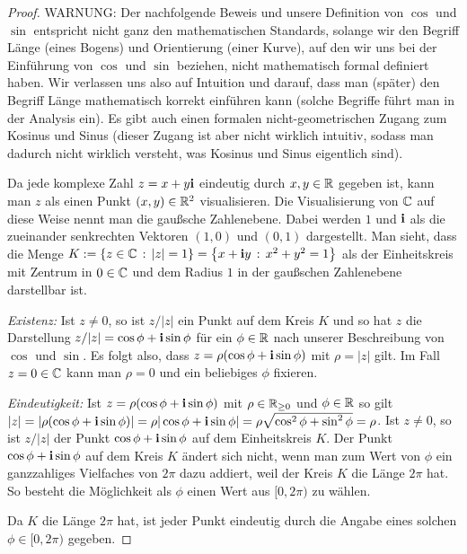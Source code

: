 \begin{proof}  
	{\color{red} WARNUNG:} Der nachfolgende Beweis und unsere Definition von $\cos$ und $\sin$ entspricht nicht ganz den mathematischen Standards, solange wir den Begriff  Länge (eines Bogens) und Orientierung (einer Kurve), auf den  wir uns bei der Einführung von $\cos$ und $\sin$ beziehen, nicht mathematisch formal definiert haben. Wir verlassen uns also auf Intuition und darauf, dass man (später) den Begriff Länge mathematisch korrekt einführen kann (solche Begriffe führt man in der Analysis ein). Es gibt auch einen formalen nicht-geometrischen Zugang zum Kosinus und Sinus (dieser Zugang ist aber nicht wirklich intuitiv, sodass man dadurch nicht wirklich versteht, was Kosinus und Sinus eigentlich sind). 
	
	Da jede komplexe Zahl $z = x + y \mathbf{i}$ eindeutig durch $x, y \in \mathbb{R}$ gegeben ist, kann man $z$ als einen Punkt $(x,y) \in \mathbb{R}^2$ visualisieren. Die Visualisierung von $\mathbb{C}$ auf diese Weise nennt man die gaußsche Zahlenebene. Dabei werden $1$ und $\mathbf{i}$ als die zueinander senkrechten Vektoren $(1,0)$ und $(0,1)$ dargestellt. Man sieht, dass die Menge $K := \left\{ z \in \mathbb{C} \,:\, |z|=1 \right\} = \left\{  x+ \mathbf{i} y \,:\, x^2 + y^2 =1 \right\}$ als  der Einheitskreis mit Zentrum in $0 \in \mathbb{C}$ und dem Radius $1$ in der gaußschen Zahlenebene darstellbar ist. 
	
	\emph{Existenz:} Ist $z \ne 0$, so ist $z / |z|$ ein Punkt auf dem Kreis $K$ und so hat $z$ die Darstellung $ z / |z| = \cos \phi + \mathbf{i} \sin \phi$ für ein $\phi \in \mathbb{R}$ nach unserer Beschreibung von $\cos$ und $\sin$. Es folgt also, dass $z = \rho ( \cos \phi + \mathbf{i} \sin \phi)$ mit $\rho = |z|$ gilt. Im Fall $z= 0 \in \mathbb{C}$ kann man $\rho =0$ und ein beliebiges $\phi$ fixieren. 
	
	\emph{Eindeutigkeit:} Ist $z = \rho (\cos \phi + \mathbf{i} \sin \phi)$ mit $\rho \in \mathbb{R}_{\ge 0}$ und $\phi \in \mathbb{R}$ so gilt $|z| = | \rho (\cos \phi + \mathbf{i} \sin \phi) | = \rho | \cos \phi + \mathbf{i} \sin \phi| = \rho \sqrt{ \cos^2 \phi + \sin^2\phi } = \rho$. Ist $z \ne 0$, so ist 
	$ z/ |z|$ der Punkt $\cos \phi + \mathbf{i} \sin \phi$ auf dem Einheitskreis $K$. Der Punkt $\cos \phi + \mathbf{i} \sin \phi$ auf dem Kreis $K$ ändert sich nicht, wenn man zum Wert von $\phi$  ein ganzzahliges Vielfaches von $2 \pi$ dazu addiert, weil der Kreis $K$ die Länge $2\pi$ hat. So besteht die Möglichkeit als $\phi$ einen Wert aus $[0,2 \pi)$ zu wählen. 
	
	 Da $K$ die Länge $2\pi$ hat, ist jeder Punkt eindeutig durch die Angabe eines solchen $\phi \in [0,2 \pi)$ gegeben. 
\end{proof} 

